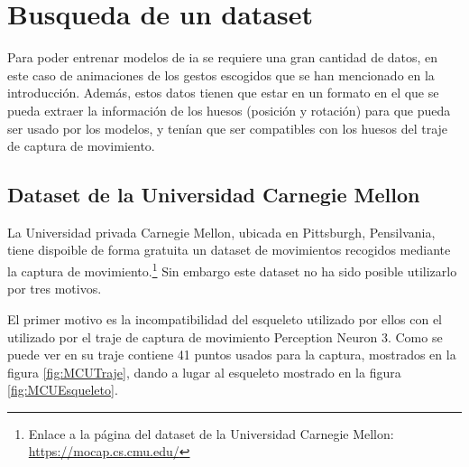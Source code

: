 \section{Busqueda de un dataset}
\label{sec:busquedaDataset}
Para poder entrenar modelos de \gls{ia} se requiere una gran cantidad de datos, en este caso de animaciones de los gestos escogidos que se han mencionado en la introducción.
Además, estos datos tienen que estar en un formato en el que se pueda extraer la información de los huesos (posición y rotación) para que pueda ser usado por los modelos, y tenían que ser compatibles con los huesos del traje de captura de movimiento.

\subsection{Dataset de la Universidad Carnegie Mellon}
La Universidad privada Carnegie Mellon, ubicada en Pittsburgh, Pensilvania, tiene dispoible de forma gratuita un dataset de movimientos recogidos mediante la captura de movimiento.\footnote{Enlace a la página del dataset de la Universidad Carnegie Mellon: \url{https://mocap.cs.cmu.edu/}}
Sin embargo este dataset no ha sido posible utilizarlo por tres motivos.

El primer motivo es la incompatibilidad del esqueleto utilizado por ellos con el utilizado por el traje de captura de movimiento Perception Neuron 3.
Como se puede ver en \cite{MCUINFO} su traje contiene 41 puntos usados para la captura, mostrados en la figura \ref{fig:MCUTraje}, dando a lugar al esqueleto mostrado en la figura \ref{fig:MCUEsqueleto}.

